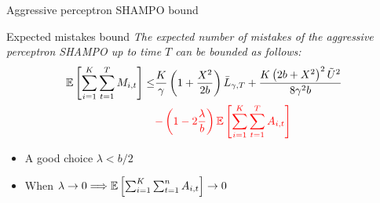 \documentclass{beamer}
\begin{document}
\begin{frame}{Aggressive perceptron SHAMPO   bound }
\begin{block}{Expected mistakes bound}
\emph{The expected  number of mistakes  of the aggressive perceptron SHAMPO  up to time $T$ can be bounded as follows:}
\begin{displaymath}
\begin{split}
\mathbb{E}\left[ \sum_{i=1}^{K}\sum_{t=1}^{T}{M_{i,t}} \right]
\le& \frac{K}{\gamma}\left(1+\frac{X^2}{2b} \right){\bar L}_{\gamma,T}+
\frac{K\left({2b+X^2}\right)^2\tilde{U}^2}{8{\gamma}^2b}\\
&\textcolor{red}{-\left({1-2\frac{\lambda}{b}}\right)\mathbb{E}\left[{\sum_{i=1}^{K}\sum_{t=1}^{T}{A_{i,t}}}\right]}~
\end{split}
\end{displaymath}
\end{block}
\begin{itemize}
\item A good choice $\lambda<b/2 $\newline
\item When $\lambda\rightarrow0\Longrightarrow\mathbb{E}\left[{\sum_{i=1}^{K}\sum_{t=1}^{n}{A_{i,t}}}\right]\rightarrow0$
\end{itemize}
\end{frame}

\end{document}

